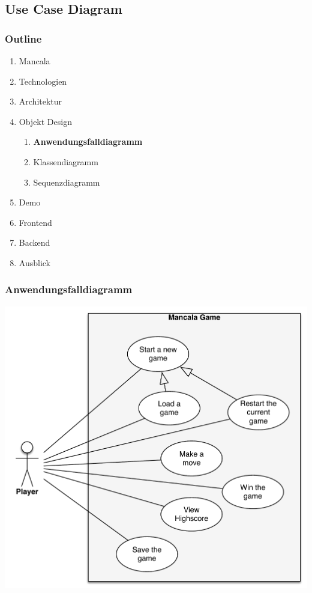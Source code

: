 \documentclass[
	10pt,
	t		%
]{beamer}
\begin{document}
\subsection{Use Case Diagram}
\begin{frame}
\frametitle{Outline}
\begin{enumerate}
\item Mancala
\item Technologien
\item Architektur
\item Objekt Design
\begin{enumerate}
\item \textbf{Anwendungsfalldiagramm}
\item Klassendiagramm
\item Sequenzdiagramm
\end{enumerate}
\item Demo
\item Frontend
\item Backend
\item Ausblick
\end{enumerate}
\end{frame}

\begin{frame}
\frametitle{Anwendungsfalldiagramm}
\begin{center}
\includegraphics[scale=0.32]{./../Diagrams/UseCases.pdf}
\end{center}
\end{frame}
\end{document}
